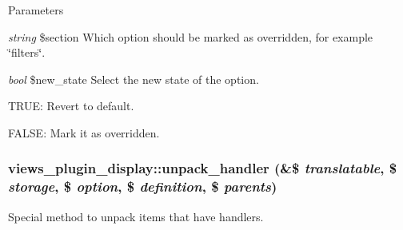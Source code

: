 \begin{DoxyParams}{Parameters}
\item[{\em string}]\$section Which option should be marked as overridden, for example \char`\"{}filters\char`\"{}. \item[{\em bool}]\$new\_\-state Select the new state of the option.
\begin{DoxyItemize}
\item TRUE: Revert to default.
\item FALSE: Mark it as overridden. 
\end{DoxyItemize}\end{DoxyParams}
\hypertarget{classviews__plugin__display_a382cd5755818e3f652caa5d3fe1f967d}{
\subsubsection[{unpack\_\-handler}]{\setlength{\rightskip}{0pt plus 5cm}views\_\-plugin\_\-display::unpack\_\-handler (\&\$ {\em translatable}, \/  \$ {\em storage}, \/  \$ {\em option}, \/  \$ {\em definition}, \/  \$ {\em parents})}}
\label{classviews__plugin__display_a382cd5755818e3f652caa5d3fe1f967d}
Special method to unpack items that have handlers.

